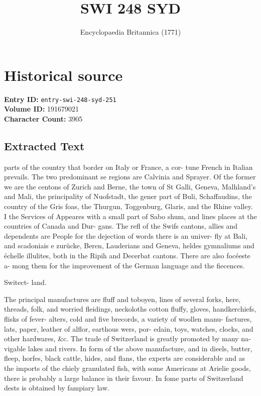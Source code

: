 \documentclass{article}
\title{SWI  248 SYD}
\date{Encyclopaedia Britannica (1771)}
\begin{document}
\maketitle

\section*{Historical source}
\textbf{Entry ID:} \texttt{entry-swi-248-syd-251} \\
\textbf{Volume ID:} 191679021 \\
\textbf{Character Count:} 3905

\subsection*{Extracted Text}
parts of the country that border on Italy or France, a cor-
tune French in Italian prevails. The two predominant se
regions are Calvinia and Sprayer. Of the former we are the
centons of Zurich and Berne, the town of St Galli, Geneva, Malhland’s and Mali, the principality of Nuofstadt, the
gener part of Buli, Schaffaudins, the country of the Gris
foas, the Thurgun, Toggenburg, Glaris, and the Rhine valley. I
the Services of Appeares with a small part of Sabo
shum, and lines places at the countries of Canada and Dur-
gans. The refl of the Swifs cantons, allies and dependents
are People for the dejection of words there is an univer-
fly at Bali, and scadoniais e zurücke, Beren, Lauderians and
Geneva, heldes gymnaliums and échelle illulites, both in the
Ripih and Decerbat cantons. There are also focéeste a-
mong them for the improvement of the German language
and the fiecences.

Switect- land.

The principal manufactures are fluff and toboyen, lines
of several forks, here, threads, folk, and worried fleidings,
neckoloths cotton fluffy, gloves, handkerchiefs, flisks of fever-
alters, cold and five brecords, a variety of woollen manu-
factures, lats, paper, leather of alflor, earthous wers, por-
edain, toys, watches, clocks, and other hardwares, \&c.
The trade of Switzerland is greatly promoted by many na-
vigable lakes and rivers. In form of the above manufacture,
and in dieels, butter, fleep, horfes, black cattle, hides, and
flans, the experts are considerable and as the imports of the
chiely granulated fish, with some Americans at Arielie goods,
there is probably a large balance in their favour. In fome
parts of Switzerland dests is obtained by fampiary law.
\end{document}
